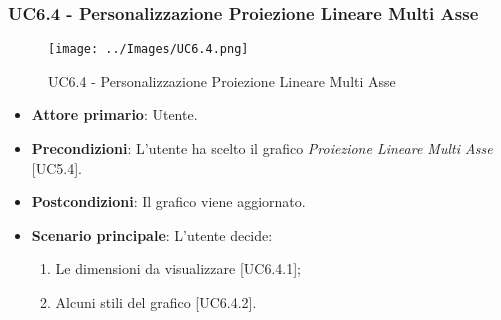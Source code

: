 \subsubsection{UC6.4 - Personalizzazione Proiezione Lineare Multi Asse}
\begin{figure}[h]
\texttt{[image: ../Images/UC6.4.png]}
\centering
\caption{UC6.4 - Personalizzazione Proiezione Lineare Multi Asse}
\end{figure}
\begin{itemize}
	\item \textbf{Attore primario}: Utente.
	
	\item \textbf{Precondizioni}: L'utente ha scelto il grafico \textit{Proiezione Lineare Multi Asse} [UC5.4].
	
	\item \textbf{Postcondizioni}: Il grafico viene aggiornato.
	
	\item \textbf{Scenario principale}: L'utente decide:
	
\begin{enumerate}
\item Le dimensioni da visualizzare [UC6.4.1];
\item Alcuni stili del grafico [UC6.4.2].
\end{enumerate}	
		
\end{itemize}